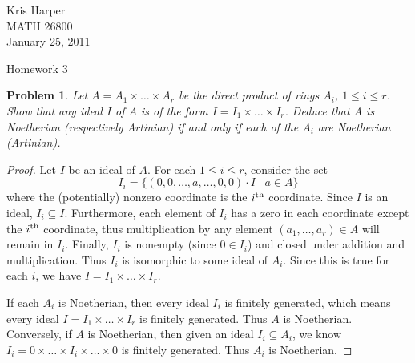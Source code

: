 \documentclass{article}
\newtheorem{problem}{Problem}
\begin{document}
\begin{flushright}
Kris Harper\\

MATH 26800\\

January 25, 2011
\end{flushright}

\begin{center}
Homework 3
\end{center}

\begin{problem}
Let $A = A_1 \times \dots \times A_r$ be the direct product of rings $A_i$, $1 \leq i \leq r$. Show that any ideal $I$ of $A$ is of the form $I = I_1 \times \dots \times I_r$. Deduce that $A$ is Noetherian (respectively Artinian) if and only if each of the $A_i$ are Noetherian (Artinian).
\end{problem}
\begin{proof}
Let $I$ be an ideal of $A$. For each $1 \leq i \leq r$, consider the set
\[
I_i = \{(0, 0, \dots , a , \dots , 0, 0) \cdot I \mid a \in A\}
\]
where the (potentially) nonzero coordinate is the $i^{\textup{th}}$ coordinate. Since $I$ is an ideal, $I_i \subseteq I$. Furthermore, each element of $I_i$ has a zero in each coordinate except the $i^{\textup{th}}$ coordinate, thus multiplication by any element $(a_1, \dots , a_r) \in A$ will remain in $I_i$. Finally, $I_i$ is nonempty (since $0 \in I_i$) and closed under addition and multiplication. Thus $I_i$ is isomorphic to some ideal of $A_i$. Since this is true for each $i$, we have $I = I_1 \times \dots \times I_r$.

If each $A_i$ is Noetherian, then every ideal $I_i$ is finitely generated, which means every ideal $I = I_1 \times \dots \times I_r$ is finitely generated. Thus $A$ is Noetherian. Conversely, if $A$ is Noetherian, then given an ideal $I_i \subseteq A_i$, we know $I_i = 0 \times \dots \times I_i \times \dots \times 0$ is finitely generated. Thus $A_i$ is Noetherian.
\end{proof}
\end{document}
